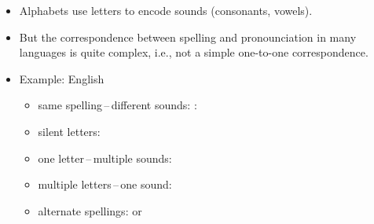 \documentclass[a4paper,landscape,headrule,footrule,xetex]{foils}
\begin{document}
\begin{itemize}
\item Alphabets use letters to encode sounds (consonants, vowels).
\item But the correspondence between spelling and pronounciation in many languages is quite complex, i.e., not a simple one-to-one correspondence.
\item Example: English
\begin{itemize}
\item same spelling\,–\,different sounds: : 
\item silent letters: 
\item one letter\,–\,multiple sounds: 
\item multiple letters\,–\,one sound: 
\item alternate spellings:  or 
\end{itemize}
\end{itemize}












\end{document}
